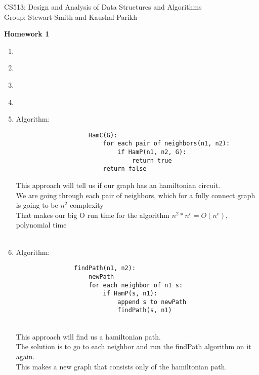 \documentclass[11pt]{article}
\begin{document}

\noindent CS513: Design and Analysis of Data Structures and Algorithms \\
        Group: Stewart Smith and Kaushal Parikh\\

        \begin{center}
        \LARGE{\textbf{Homework 1}}\\
            \end{center}

            \vspace{.1in}


            \begin{enumerate}

            \item \\
            \item \\
            \item \\
            \item \\
            \item Algorithm:
                    \begin{verbatim}
                    HamC(G):
                        for each pair of neighbors(n1, n2):
                            if HamP(n1, n2, G):
                                return true
                        return false
                    \end{verbatim}

                    This approach will tell us if our graph has an hamiltonian circuit. \\
                    We are going through each pair of neighbors, which for a fully connect graph is going to be $n^2$ complexity\\
                    That makes our big O run time for the algorithm $n^2 * n^c = O(n^c)$, polynomial time\\
                    \\
            \item
               Algorithm:
               \begin{verbatim}
                findPath(n1, n2):
                    newPath
                    for each neighbor of n1 s:
                        if HamP(s, n1):
                            append s to newPath
                            findPath(s, n1)
               \end{verbatim}\\

               This approach will find us a hamiltonian path.\\
               The solution is to go to each neighbor and run the findPath algorithm on it again. \\
               This makes a new graph that consists only of the hamiltonian path.\\

            \end{enumerate}

                                
\end{document}

